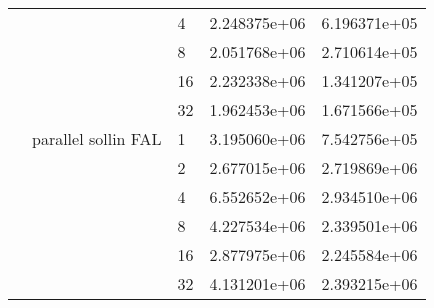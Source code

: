 \begin{tabular}{lllrr}
                                                       &                     & 4  &  2.248375e+06 &  6.196371e+05 \\
                                                       &                     & 8  &  2.051768e+06 &  2.710614e+05 \\
                                                       &                     & 16 &  2.232338e+06 &  1.341207e+05 \\
                                                       &                     & 32 &  1.962453e+06 &  1.671566e+05 \\
                                                       & parallel sollin FAL & 1  &  3.195060e+06 &  7.542756e+05 \\
                                                       &                     & 2  &  2.677015e+06 &  2.719869e+06 \\
                                                       &                     & 4  &  6.552652e+06 &  2.934510e+06 \\
                                                       &                     & 8  &  4.227534e+06 &  2.339501e+06 \\
                                                       &                     & 16 &  2.877975e+06 &  2.245584e+06 \\
                                                       &                     & 32 &  4.131201e+06 &  2.393215e+06 \\
\bottomrule
\end{tabular}
